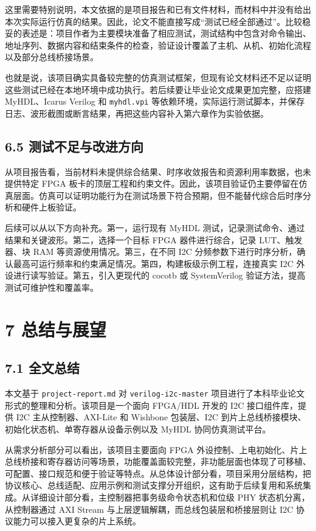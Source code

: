 这里需要特别说明，本文依据的是项目报告和已有文件材料，而材料中并没有给出本次实际运行仿真的结果。因此，论文不能直接写成``测试已经全部通过''。比较稳妥的表述是：项目作者为主要模块准备了相应测试，测试结构中包含对命令输出、地址序列、数据内容和结束条件的检查，验证设计覆盖了主机、从机、初始化流程以及部分总线桥接场景。

也就是说，该项目确实具备较完整的仿真测试框架，但现有论文材料还不足以证明这些测试已经在本地环境中成功执行。若后续要让毕业论文成果更加完整，应搭建 MyHDL、Icarus Verilog 和 \texttt{myhdl.vpi} 等依赖环境，实际运行测试脚本，并保存日志、波形截图或断言结果，再把这些内容补入第六章作为实验依据。

\subsection{6.5 测试不足与改进方向}\label{ux6d4bux8bd5ux4e0dux8db3ux4e0eux6539ux8fdbux65b9ux5411}

从项目报告看，当前材料未提供综合结果、时序收敛报告和资源利用率数据，也未提供特定 FPGA 板卡的顶层工程和约束文件。因此，该项目验证仍主要停留在仿真层面。仿真可以证明功能行为在测试场景下符合预期，但不能替代综合后时序分析和硬件上板验证。

后续可以从以下方向补充。第一，运行现有 MyHDL 测试，记录测试命令、通过结果和关键波形。第二，选择一个目标 FPGA 器件进行综合，记录 LUT、触发器、块 RAM 等资源使用情况。第三，在不同 I2C 分频参数下进行时序分析，确认最高可运行频率和约束满足情况。第四，构建板级示例工程，连接真实 I2C 外设进行读写验证。第五，引入更现代的 cocotb 或 SystemVerilog 验证方法，提高测试可维护性和覆盖率。

\section{7 总结与展望}\label{ux603bux7ed3ux4e0eux5c55ux671b}

\subsection{7.1 全文总结}\label{ux5168ux6587ux603bux7ed3}

本文基于 \texttt{project-report.md} 对 \texttt{verilog-i2c-master} 项目进行了本科毕业论文形式的整理和分析。该项目是一个面向 FPGA/HDL 开发的 I2C 接口组件库，提供 I2C 主从控制器、AXI-Lite 和 Wishbone 包装层、I2C 到片上总线桥接模块、初始化状态机、单寄存器从设备示例以及 MyHDL 协同仿真测试平台。

从需求分析部分可以看出，该项目主要面向 FPGA 外设控制、上电初始化、片上总线桥接和寄存器访问等场景，功能覆盖面较完整，非功能层面也体现了可移植、可配置、接口规范和便于验证等特点。从总体设计部分看，项目采用分层结构，把协议核心、总线适配、应用示例和测试支撑分开组织，这有助于后续复用和系统集成。从详细设计部分看，主控制器把事务级命令状态机和位级 PHY 状态机分离，从控制器通过 AXI Stream 与上层逻辑解耦，而总线包装层和桥接层则让 I2C 协议能力可以接入更复杂的片上系统。

